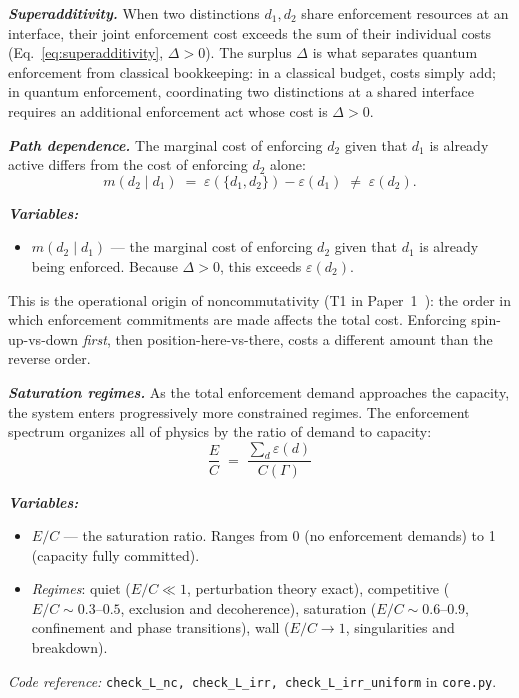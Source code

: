 \documentclass[11pt]{article}
\newenvironment{varlist}{\begin{itemize}[nosep,leftmargin=2em]}{\end{itemize}}
\newcommand{\coderef}[2]{\smallskip\noindent\textit{Code reference:} \texttt{#1} in \texttt{#2}.}
\begin{document}
\begin{tcolorbox}[apfbox, title={Consequences of $L_{\mathrm{nc}}^{\mathrm{interf}}$: Superadditivity, Path Dependence, Saturation}]

\textbf{\textit{Superadditivity.}}  When two distinctions $d_1, d_2$ share enforcement resources at an interface, their joint enforcement cost exceeds the sum of their individual costs (Eq.~\ref{eq:superadditivity}, $\Delta > 0$).  The surplus $\Delta$ is what separates quantum enforcement from classical bookkeeping: in a classical budget, costs simply add; in quantum enforcement, coordinating two distinctions at a shared interface requires an additional enforcement act whose cost is $\Delta > 0$.

\medskip
\textbf{\textit{Path dependence.}}  The marginal cost of enforcing $d_2$ given that $d_1$ is already active differs from the cost of enforcing $d_2$ alone:
\begin{equation}
m(d_2 \mid d_1) \;=\; \varepsilon(\{d_1, d_2\}) - \varepsilon(d_1) \;\ne\; \varepsilon(d_2).
\label{eq:path_dependence}
\end{equation}

\smallskip\noindent\textbf{\textit{Variables:}}
\begin{varlist}
\item $m(d_2 \mid d_1)$ --- the marginal cost of enforcing $d_2$ given that $d_1$ is already being enforced.  Because $\Delta > 0$, this exceeds $\varepsilon(d_2)$.
\end{varlist}

This is the operational origin of noncommutativity (T1 in Paper~1~\cite{BrookePaper1}): the order in which enforcement commitments are made affects the total cost.  Enforcing spin-up-vs-down \emph{first}, then position-here-vs-there, costs a different amount than the reverse order.

\medskip
\textbf{\textit{Saturation regimes.}}  As the total enforcement demand approaches the capacity, the system enters progressively more constrained regimes.  The enforcement spectrum organizes all of physics by the ratio of demand to capacity:
\begin{equation}
\frac{E}{C} \;=\; \frac{\sum_d \varepsilon(d)}{C(\Gamma)}
\label{eq:saturation_ratio}
\end{equation}

\smallskip\noindent\textbf{\textit{Variables:}}
\begin{varlist}
\item $E/C$ --- the saturation ratio.  Ranges from 0 (no enforcement demands) to 1 (capacity fully committed).
\item \textit{Regimes}: quiet ($E/C \ll 1$, perturbation theory exact), competitive ($E/C \sim 0.3$--$0.5$, exclusion and decoherence), saturation ($E/C \sim 0.6$--$0.9$, confinement and phase transitions), wall ($E/C \to 1$, singularities and breakdown).
\end{varlist}

\coderef{check\_L\_nc, check\_L\_irr, check\_L\_irr\_uniform}{core.py}
\end{tcolorbox}
\end{document}
